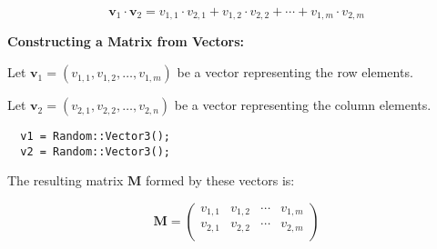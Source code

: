 \[
\mathbf{v}_1 \cdot \mathbf{v}_2 = v_{1,1} \cdot v_{2,1} + v_{1,2} \cdot v_{2,2} + \cdots + v_{1,m} \cdot v_{2,m}
\]


\textbf{Constructing a Matrix from Vectors:}

Let \( \mathbf{v}_1 = (v_{1,1}, v_{1,2}, \ldots, v_{1,m}) \) be a vector representing the row elements.

Let \( \mathbf{v}_2 = (v_{2,1}, v_{2,2}, \ldots, v_{2,n}) \) be a vector representing the column elements.


\begin{lstlisting}
  v1 = Random::Vector3();
  v2 = Random::Vector3();
\end{lstlisting}






The resulting matrix \( \mathbf{M} \) formed by these vectors is:

\[
\mathbf{M} = \begin{pmatrix}
v_{1,1} & v_{1,2} & \cdots & v_{1,m} \\
v_{2,1} & v_{2,2} & \cdots & v_{2,m} \\
\end{pmatrix}
\]





